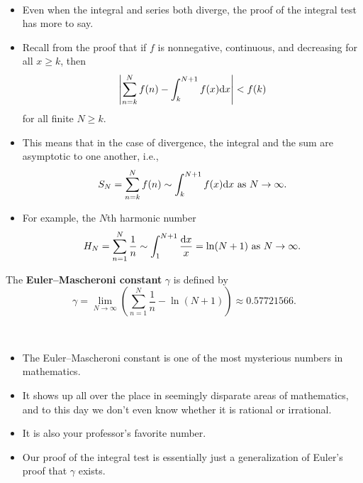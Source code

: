 \newpage

\begin{remark}\,
\begin{itemize}
\item Even when the integral and series both diverge, the proof of the integral test has more to say.
\item Recall from the proof that if $f$ is nonnegative, continuous, and decreasing for all $x\ge k$, then
\begin{equation*}
\left|\sum_{n=k}^N f(n) - \int_k^{N+1} f(x)\mathrm{d} x\right| < f(k)
\end{equation*}
for all finite $N\ge k$.
\item This means that in the case of divergence, the integral and the sum are asymptotic to one another, i.e., 
\begin{equation*}
S_N = \sum_{n=k}^N f(n) \sim \int_k^{N+1}f(x)\mathrm{d} x \text{ as } N\to\infty.
\end{equation*}
\item For example, the $N$th harmonic number
\begin{equation*}
H_N = \sum_{n=1}^N\frac{1}{n} \sim \int_1^{N+1}\frac{\mathrm{d} x}{x} = \ln(N+1) \text{ as }N\to\infty.
\end{equation*}
\end{itemize}
\end{remark}

\vfill

\begin{definition}
The \textbf{Euler--Mascheroni constant} $\gamma$ is defined by 
\begin{equation*}
\gamma = \lim_{N\to \infty}\left(\sum_{n=1}^N\frac{1}{n} - \ln(N+1)\right)\approx 0.57721566.
\end{equation*}
\end{definition}

\vfill

\begin{remark}\,
\begin{itemize}
\item The Euler--Mascheroni constant is one of the most mysterious numbers in mathematics.
\item It shows up all over the place in seemingly disparate areas of mathematics, and to this day we don't even know whether it is rational or irrational.
\item It is also your professor's favorite number.
\item Our proof of the integral test is essentially just a generalization of Euler's proof that $\gamma$ exists.
\end{itemize}
\end{remark}

